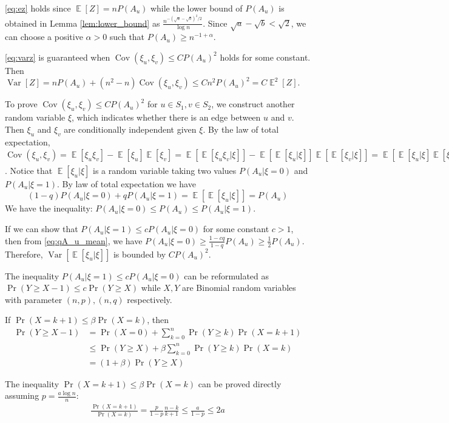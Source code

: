 \documentclass{article}
\DeclareMathOperator{\Var}{Var}
\DeclareMathOperator{\Cov}{Cov}
\DeclareMathOperator{\E}{\mathbb{E}}
\begin{document}
\eqref{eq:ez} holds since $\E[Z]
= n P(A_u)$ while the lower bound
of $P(A_u)$ is obtained
in Lemma \ref{lem:lower_bound} as $\frac{n^{-(\sqrt{a}-\sqrt{b})^2/2}}{\log n}$.
Since $\sqrt{a} - \sqrt{b}<\sqrt{2}$,
we can choose a positive $\alpha>0$ such
that $P(A_u) \geq n^{-1+\alpha}$.

\eqref{eq:varz} is guaranteed when
$\Cov(\xi_u, \xi_v) \leq C P(A_u)^2$
holds for
some constant. Then $\Var[Z]=nP(A_u)+(n^2-n)
\Cov(\xi_u, \xi_v) \leq Cn^2P(A_u)^2=C\E^2[Z]$.

To prove $\Cov(\xi_u, \xi_v) \leq 
C P(A_u)^2$ for $u \in S_1, v\in S_2$,
we construct another
random variable $\xi$, which
indicates whether there is an edge
between $u$ and $v$.
Then $\xi_u$ and $\xi_v$ are conditionally
independent given $\xi$.
By the law of total expectation,
$\Cov(\xi_u, \xi_v)
= \E[\xi_u\xi_v] - \E[\xi_u]
\E[\xi_v]= \E[\E[\xi_u\xi_v|\xi]]
- \E[\E[\xi_u|\xi]]
\E[\E[\xi_v| \xi]]
= \E[\E[\xi_u|\xi]\E[\xi_v|\xi]]
- \E[\E[\xi_u|\xi]]
\E[\E[\xi_v| \xi]]
=\Cov(\E[\xi_u|\xi], \E[\xi_v|\xi])
\leq \sqrt{\Var[\E[\xi_u|\xi]]
\Var[\E[\xi_v|\xi]]}=\Var[\E[\xi_u|\xi]]$.
Notice that $\E[\xi_u|\xi]$ is a random
variable taking two values
$P(A_u | \xi=0)$
and $P(A_u | \xi=1)$.
By law of total expectation we have
\begin{equation}\label{eq:qA_u_mean}
	(1-q) P(A_u | \xi = 0)
	+ q P(A_u | \xi = 1)
	= \E[\E[\xi_u | \xi]]=P(A_u)
\end{equation}
We have the inequality:
$P(A_u | \xi = 0)\leq P(A_u) \leq P(A_u | \xi = 1)$.

If we can show that $P(A_u | \xi = 1) \leq c P(A_u | \xi=0)$
for some constant $c>1$, then from
\eqref{eq:qA_u_mean}, we have
$P(A_u | \xi=0)
\geq \frac{1-cq}{1-q} P(A_u) \geq \frac{1}{2} P(A_u)$.
Therefore, $\Var[\E[\xi_u | \xi]]$ is bounded
by $C P(A_u)^2$.

The inequality $P(A_u | \xi = 1) \leq c P(A_u | \xi=0)$
can be reformulated as 
$\Pr(Y\geq X - 1) \leq c \Pr(Y\geq X)$ while
$X, Y$ are Binomial random variables with parameter
$(n, p), (n, q)$ respectively.

If $\Pr(X=k+1) \leq \beta \Pr(X=k)$, then
\begin{align*}
	\Pr(Y\geq X-1)
	& = \Pr(X=0) + \sum_{k=0}^n \Pr(Y\geq k)\Pr(X=k+1) \\
	& \leq \Pr(Y\geq X)+ \beta\sum_{k=0}^n \Pr(Y\geq k)\Pr(X=k) \\
	& = (1+\beta)\Pr(Y\geq X)
\end{align*}

The inequality $\Pr(X=k+1) \leq \beta \Pr(X=k)$ can be proved directly assuming
$p=\frac{a \log n}{n}$:
\begin{align*}
\frac{\Pr(X=k+1)}{\Pr(X=k)}
= \frac{p}{1-p} \frac{n-k}{k+1} \leq \frac{a}{1-p}\leq 2a
\end{align*}
\end{document}
